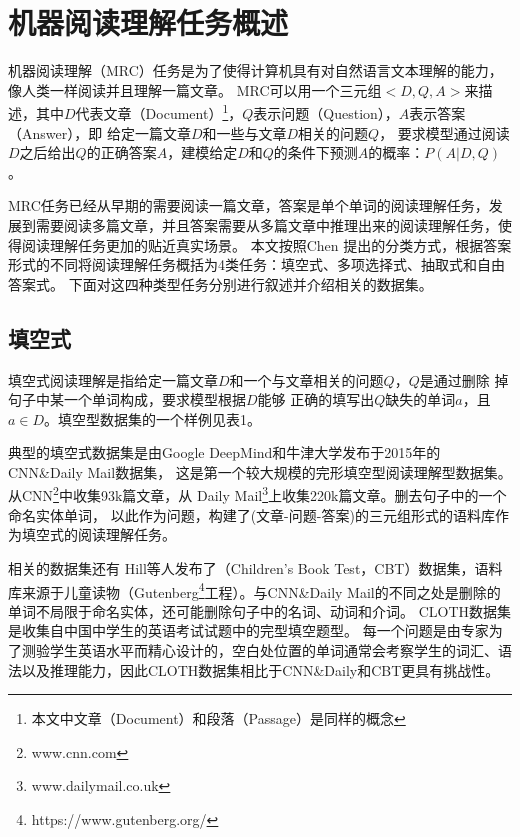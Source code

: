 \section{机器阅读理解任务概述}

机器阅读理解（MRC）任务是为了使得计算机具有对自然语言文本理解的能力，像人类一样阅读并且理解一篇文章。
MRC可以用一个三元组$<D,Q,A>$来描述，其中$D$代表文章（Document）\footnote{本文中文章（Document）和段落（Passage）是同样的概念}，$Q$表示问题（Question），$A$表示答案（Answer），即
给定一篇文章$D$和一些与文章$D$相关的问题$Q$，
要求模型通过阅读$D$之后给出$Q$的正确答案$A$，建模给定$D$和$Q$的条件下预测$A$的概率：$P(A|D,Q)$
。

MRC任务已经从早期的需要阅读一篇文章，答案是单个单词的阅读理解任务，发展到需要阅读多篇文章，并且答案需要从多篇文章中推理出来的阅读理解任务，使得阅读理解任务更加的贴近真实场景。
本文按照Chen
提出的分类方式，根据答案形式的不同将阅读理解任务概括为4类任务：填空式、多项选择式、抽取式和自由答案式。
下面对这四种类型任务分别进行叙述并介绍相关的数据集。



\subsection{填空式}
填空式阅读理解是指给定一篇文章$D$和一个与文章相关的问题$Q$，$Q$是通过删除
掉句子中某一个单词构成，要求模型根据$D$能够
正确的填写出$Q$缺失的单词$a$，且$a\in D$。填空型数据集的一个样例见表1。

典型的填空式数据集是由Google DeepMind和牛津大学发布于2015年的CNN\&Daily Mail数据集，
这是第一个较大规模的完形填空型阅读理解型数据集。从CNN\footnote{www.cnn.com\label{cnn}}中收集93k篇文章，从
Daily Mail\footnote{www.dailymail.co.uk\label{daily mail}}上收集220k篇文章。删去句子中的一个命名实体单词，
以此作为问题，构建了(文章-问题-答案)的三元组形式的语料库作为填空式的阅读理解任务。

相关的数据集还有
Hill等人发布了（Children's Book Test，CBT）数据集，语料库来源于儿童读物（Gutenberg\footnote{https://www.gutenberg.org/\label{cbt}}工程）。与CNN\&Daily Mail的不同之处是删除的单词不局限于命名实体，还可能删除句子中的名词、动词和介词。
CLOTH数据集是收集自中国中学生的英语考试试题中的完型填空题型。
每一个问题是由专家为了测验学生英语水平而精心设计的，空白处位置的单词通常会考察学生的词汇、语法以及推理能力，因此CLOTH数据集相比于CNN\&Daily和CBT更具有挑战性。

